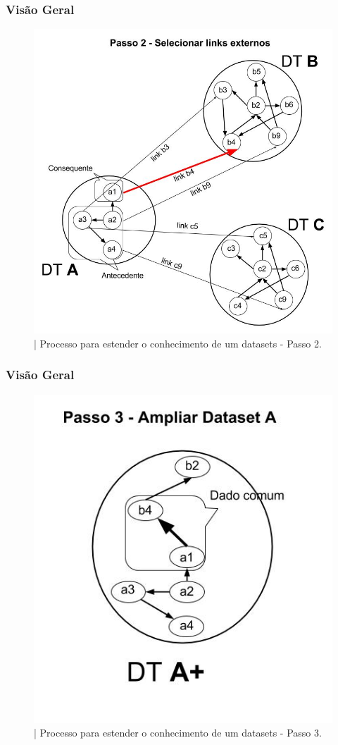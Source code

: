 \documentclass[hyperref={pdfpagelabels=false}]{beamer}
\begin{document}
       
	\begin{frame}
    \frametitle{Visão Geral}
    \begin{figure}[h]
	\centering
		\includegraphics[scale=0.2]{img/VisaoGeralProposta2}
	\caption{| Processo para estender o conhecimento de um datasets - Passo 2.}
	\label{fig:VisaoGeralProposta2}
\end{figure}
	\end{frame}
       
	\begin{frame}
    \frametitle{Visão Geral}
    \begin{figure}[h]
	\centering
		\includegraphics[scale=0.3]{img/VisaoGeralProposta3}
	\caption{| Processo para estender o conhecimento de um datasets - Passo 3.}
	\label{fig:VisaoGeralProposta3}
\end{figure}
	\end{frame}
       
\end{document}
